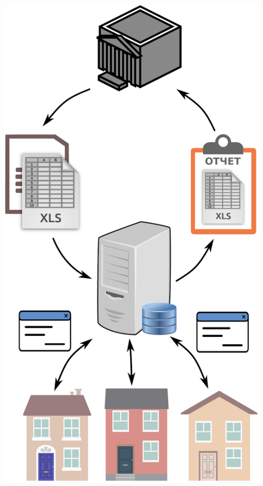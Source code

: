 \documentclass[10pt]{beamer}
\begin{document}
\begin{frame}
\begin{columns}
\begin{column}{0.4\linewidth}
  \includegraphics[width=1\linewidth]{pics/mku-task.pdf}
    \end{column}
  \end{columns}
\end{frame}
\end{document}
